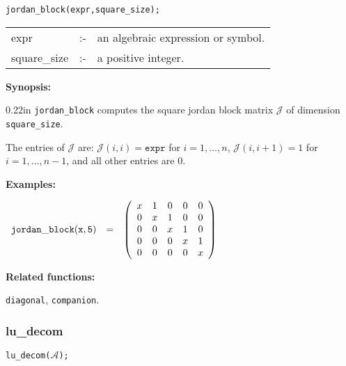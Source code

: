 \hspace*{0.175in} {\tt jordan\_block(expr,square\_size);}

\hspace*{0.1in} 
\begin{tabular}{l l l}
expr        &:-& an algebraic expression or symbol. \\
square\_size &:-& a positive integer.
\end{tabular}

{\bf Synopsis:} %

\begin{addtolength}{\leftskip}{0.22in}
{\tt jordan\_block} computes the square jordan block matrix $\mathcal{J}$
                of dimension \texttt{square\_size}.

The entries of $\mathcal{J}$ are: $\mathcal{J}(i,i) = \texttt{expr}$ for
                $i=1,\ldots,n$, $\mathcal{J}(i,i+1) = 1$ for $i=1,\ldots,n-1$,
                and all other entries are 0.

\end{addtolength}

{\bf Examples:}

\begin{flushleft}  
\hspace*{0.1in}
\begin{math}        
\begin{array}{ccc}
{\tt jordan\_block(x,5)} & = & 
\left( \begin{array}{ccccc} x & 1 & 0 & 0 & 0 \\ 0 & x & 1 & 0 & 0 \\ 0 
& 0 & x & 1 & 0 \\ 0 & 0 & 0 & x & 1 \\ 0 & 0 & 0 & 0 & x
\end{array} \right)
\end{array}
\end{math}  
\end{flushleft}

{\bf Related functions:}

\hspace*{0.175in} {\tt diagonal}, {\tt companion}.


\subsubsection{lu\_decom}
\label{linalg:lu_decom}

\hspace*{0.175in} {\tt lu\_decom($\mathcal{A}$);}

